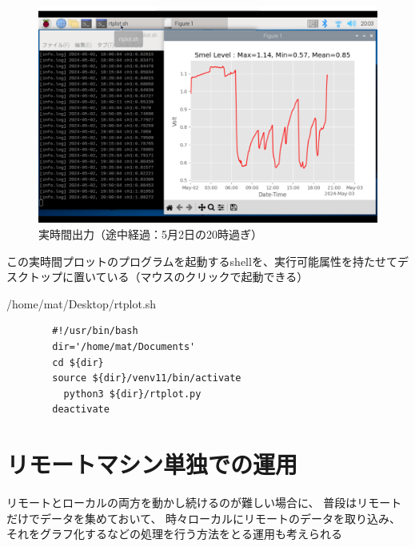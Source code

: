 \documentclass[12pt,a4paper,uplatex]{jsarticle}
\begin{document}
\begin{figure}[htbp]
	\begin{minipage}[b]{1.0\linewidth}
		\centering
		\includegraphics[keepaspectratio, scale=0.26]{figs/png/screen2.png}
		\caption{実時間出力（途中経過：5月2日の20時過ぎ）}
	\end{minipage}
\end{figure}

この実時間プロットのプログラムを起動するshellを、実行可能属性を持たせてデスクトップに置いている（マウスのクリックで起動できる）

\begin{itembox}[l]{/home/mat/Desktop/rtplot.sh}
	\begin{verbatim}
		#!/usr/bin/bash
		dir='/home/mat/Documents'
		cd ${dir}
		source ${dir}/venv11/bin/activate
		  python3 ${dir}/rtplot.py
		deactivate
	\end{verbatim}
\end{itembox}

\newpage

\section{リモートマシン単独での運用}

リモートとローカルの両方を動かし続けるのが難しい場合に、
普段はリモートだけでデータを集めておいて、
時々ローカルにリモートのデータを取り込み、
それをグラフ化するなどの処理を行う方法をとる運用も考えられる
\end{document}
